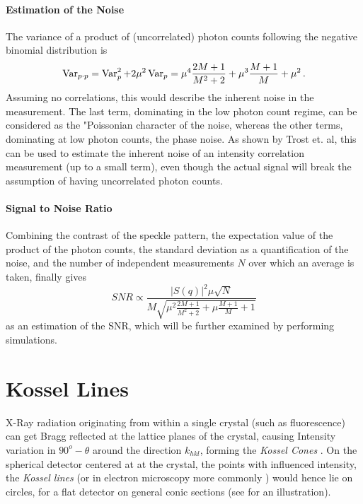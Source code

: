 \paragraph{Estimation of the Noise}
The variance of a product of (uncorrelated) photon counts following the negative binomial distribution  is
\begin{equation}
	\operatorname{Var}_{p\cdot p}= \operatorname{Var}_p^2 +2 \mu^2\operatorname{Var}_p	= \mu^4 \frac{2 M + 1}{M^2 + 2}+ \mu^3 \frac{M+1}{M} + \mu^2 \,.
\end{equation}
Assuming no correlations, this would describe the inherent noise in the measurement. The last term, dominating in the low photon count regime, can be considered as the "Poissonian character of the noise, whereas the other terms, dominating at low photon counts, the phase noise.
As shown by Trost et. al, this can be used to estimate the inherent noise of an intensity correlation measurement (up to a small term), even though the actual signal will break the assumption of having uncorrelated photon counts\cite{trost2020}.

\paragraph{Signal to Noise Ratio}
Combining the contrast of the speckle pattern, the expectation value of the product of the photon counts, the standard deviation as a quantification of the noise, and the number of independent measurements $N$ over which an average is taken, finally gives 
\begin{equation}
SNR\propto  \frac{|S(q)|^2 \mu\sqrt{N}}{M\sqrt{\mu^2 \frac{2 M + 1}{M^2 + 2}+ \mu \frac{M+1}{M} + 1}}
\end{equation}
as an estimation of the SNR, which will be further examined by performing simulations.








\section{Kossel Lines}
\label{sec:kossel}
X-Ray radiation  originating from within a single crystal (such as fluorescence) can get Bragg reflected at the lattice planes of the crystal, causing Intensity variation in $90^o-\theta$ around the direction $k_{hkl}$, forming the \textit{Kossel Cones} \cite{cowley1995}. On the spherical detector centered at at the crystal, the points with influenced intensity, the \textit{Kossel lines} (or in electron microscopy more commonly ) would hence lie on circles, for a flat detector on general conic sections (see  for an illustration).

